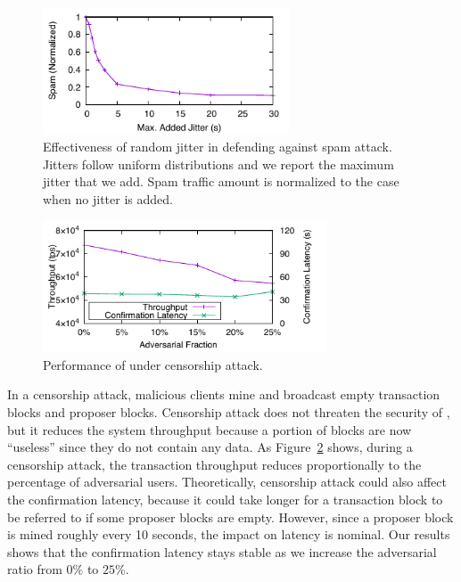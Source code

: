 \begin{figure}
    \centering
    \includegraphics[width=0.65\textwidth]{figures/attack-fig-spamming.pdf}
    \caption[Effectiveness of random jitter against spam attack.]{Effectiveness of random jitter in defending against spam attack. Jitters follow uniform distributions and we report the maximum jitter that we add. Spam traffic amount is normalized to the case when no jitter is added.}
    \label{fig:attack-spamming}
\end{figure}









\begin{figure}
    \centering
    \includegraphics[width=0.75\textwidth]{figures/attack-fig-censor.pdf}
    \caption{Performance of \prism under  censorship attack.}
    \label{fig:attack-censor}
\end{figure}

In a censorship attack, malicious clients mine and broadcast empty transaction blocks and proposer blocks. Censorship attack does not threaten the security of \prism, but it reduces the system throughput because a portion of blocks are now ``useless'' since they do not contain any data. As Figure~\ref{fig:attack-censor} shows, during a censorship attack, the transaction throughput reduces proportionally to the percentage of adversarial users. Theoretically, censorship attack could also affect the confirmation latency, because it could take longer for a transaction block to be referred to if some proposer blocks are empty. However, since a proposer block is mined roughly every 10 seconds, the impact on latency is nominal. Our results shows that the confirmation latency stays stable as we increase the adversarial ratio from $0\%$ to $25\%$.


